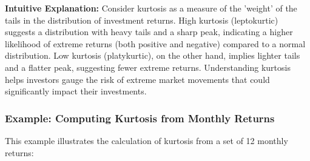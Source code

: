 \documentclass{article}
\begin{document}
\textbf{Intuitive Explanation:} 
Consider kurtosis as a measure of the 'weight' of the tails in the distribution of investment returns. High kurtosis (leptokurtic) suggests a distribution with heavy tails and a sharp peak, indicating a higher likelihood of extreme returns (both positive and negative) compared to a normal distribution. Low kurtosis (platykurtic), on the other hand, implies lighter tails and a flatter peak, suggesting fewer extreme returns. Understanding kurtosis helps investors gauge the risk of extreme market movements that could significantly impact their investments.

\subsubsection{Example: Computing Kurtosis from Monthly Returns}

This example illustrates the calculation of kurtosis from a set of 12 monthly returns:
\end{document}
